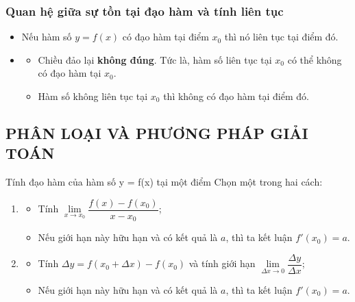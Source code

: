 \subsubsection{Quan hệ giữa sự tồn tại đạo hàm và tính liên tục}
\begin{itemize}
	\item [\iconMT]  Nếu hàm số  $y=f(x)$  có đạo hàm tại điểm $x_0$   thì nó liên tục tại điểm đó.
	\item [\iconMT] 
	\begin{gachsoc}
		\begin{itemize}
			\item [$\bullet$] Chiều đảo lại \textbf{không đúng}. Tức là, hàm số liên tục tại $x_0$ có thể không có đạo hàm tại $x_0$.
			\item [$\bullet$] Hàm số không liên tục tại $x_0$ thì không có đạo hàm tại điểm đó.
		\end{itemize}
	\end{gachsoc}
\end{itemize}

\subsection{PHÂN LOẠI VÀ PHƯƠNG PHÁP GIẢI TOÁN}

\begin{dang}{Tính đạo hàm của hàm số y = f(x) tại một điểm}
	Chọn một trong hai cách:
	\begin{enumerate}[\iconCH]
		\item {}
		\begin{itemize}
			\item [$\bullet$] Tính $\lim\limits_{x\to x_0}\dfrac{f(x)-f(x_0)}{x-x_0}$;
			\item [$\bullet$] Nếu giới hạn này hữu hạn và có kết quả là $a$, thì ta kết luận $f'(x_0)=a$.
		\end{itemize}
		\item {}
		\begin{itemize}
			\item [$\bullet$] Tính $\Delta y=f(x_0+\Delta x)-f(x_0)$ và tính giới hạn $\lim\limits_{\Delta x \to 0}\dfrac{\Delta y}{\Delta x}$;
			\item [$\bullet$] Nếu giới hạn này hữu hạn và có kết quả là $a$, thì ta kết luận $f'(x_0)=a$.
		\end{itemize}
	\end{enumerate}
\end{dang}

